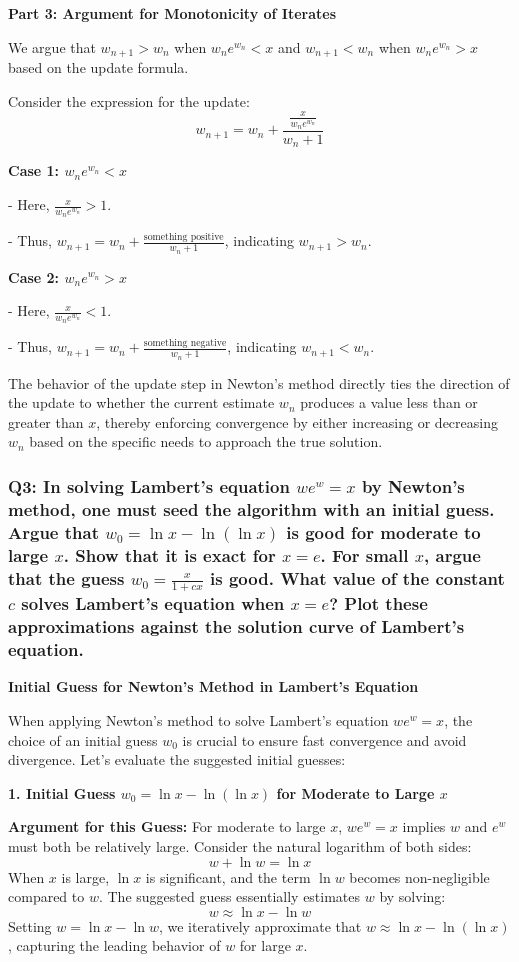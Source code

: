 \documentclass[8pt]{article}
\begin{document}
\textbf{Part 3: Argument for Monotonicity of Iterates}

We argue that \(w_{n+1} > w_n\) when \(w_n e^{w_n} < x\) and \(w_{n+1} < w_n\) when \(w_n e^{w_n} > x\) based on the update formula.

Consider the expression for the update:
\[ w_{n+1} = w_n + \frac{\frac{x}{w_n e^{w_n}}}{w_n + 1} \]

\textbf{Case 1: \(w_n e^{w_n} < x\)}

- Here, \(\frac{x}{w_n e^{w_n}} > 1\).

- Thus, \(w_{n+1} = w_n + \frac{\text{something positive}}{w_n + 1}\), indicating \(w_{n+1} > w_n\).

\textbf{Case 2: \(w_n e^{w_n} > x\)}

- Here, \(\frac{x}{w_n e^{w_n}} < 1\).

- Thus, \(w_{n+1} = w_n + \frac{\text{something negative}}{w_n + 1}\), indicating \(w_{n+1} < w_n\).

The behavior of the update step in Newton’s method directly ties the direction of the update to whether the current estimate \(w_n\) produces a value less than or greater than \(x\), thereby enforcing convergence by either increasing or decreasing \(w_n\) based on the specific needs to approach the true solution.

\subsubsection*{Q3: In solving Lambert’s equation \(we^w = x\) by Newton’s method, one must seed the algorithm with an initial guess. Argue that \(w_0 = \ln x - \ln(\ln x)\) is good for moderate to large \(x\). Show that it is exact for \(x = e\). For small \(x\), argue that the guess \(w_0 = \frac{x}{1 + cx}\) is good. What value of the constant \(c\) solves Lambert’s equation when \(x = e\)? Plot these approximations against the solution curve of Lambert’s equation.}

\textbf{Initial Guess for Newton's Method in Lambert's Equation}

When applying Newton's method to solve Lambert's equation \(we^w = x\), the choice of an initial guess \(w_0\) is crucial to ensure fast convergence and avoid divergence. Let's evaluate the suggested initial guesses:

\textbf{1. Initial Guess \(w_0 = \ln x - \ln(\ln x)\) for Moderate to Large \(x\)}

\textbf{Argument for this Guess:}
For moderate to large \(x\), \(we^w = x\) implies \(w\) and \(e^w\) must both be relatively large. Consider the natural logarithm of both sides:
\[ w + \ln w = \ln x \]
When \(x\) is large, \(\ln x\) is significant, and the term \(\ln w\) becomes non-negligible compared to \(w\). The suggested guess essentially estimates \(w\) by solving:
\[ w \approx \ln x - \ln w \]
Setting \(w = \ln x - \ln w\), we iteratively approximate that \(w \approx \ln x - \ln(\ln x)\), capturing the leading behavior of \(w\) for large \(x\).
\end{document}
